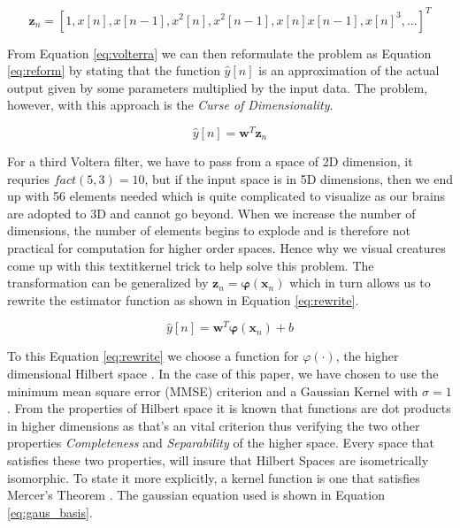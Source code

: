\documentclass[conference]{IEEEtran}
\begin{document}
\begin{equation}
\mathbf{z}_n = [1, x[n], x[n-1], x^2[n], x^2[n-1], x[n] x[n-1], x[n]^3, ...]^T
\label{eq:volterra}
\end{equation}

From Equation \ref{eq:volterra} we can then reformulate the problem as Equation \ref{eq:reform} by stating that the function $\hat{y}[n]$ is an approximation of the actual output
given by some parameters multiplied by the input data. The problem, however, with this approach is the \textit{Curse of Dimensionality}.

\begin{equation}
\hat{y}[n] = \mathbf{w}^T\mathbf{z}_n
\label{eq:reform}
\end{equation}

 For a third Voltera filter, we have to pass from a space of 2D dimension, it requries $fact(5, 3) = 10$, but if the input space is in 5D dimensions, then we end up with 56 elements needed which is quite complicated to visualize as our brains are adopted to 3D and cannot go beyond.
 When we increase the number of dimensions, the number of elements begins to explode and is therefore not practical for computation
 for higher order spaces. Hence why we visual creatures come up with this textit{kernel trick} to help solve this problem. The transformation can be generalized by $\mathbf{z}_n = \mathbf{\varphi}(\mathbf{x}_n)$ 
 which in turn allows us to rewrite the estimator function as shown in Equation \ref{eq:rewrite}. 
 
 \begin{equation}
\hat{y}[n] = \mathbf{w}^T\mathbf{\varphi}(\mathbf{x}_n) + b
\label{eq:rewrite}
\end{equation}

To this Equation \ref{eq:rewrite} we choose a function for $\varphi(\cdot)$, the higher dimensional Hilbert space \cite{kernelmethods}. In 
the case of this paper, we have chosen to use the minimum mean square error (MMSE) criterion and a Gaussian Kernel with $\sigma = 1$. From the properties of Hilbert space it is known that functions are dot products in higher dimensions as that's an vital criterion thus verifying the two other properties \textit{Completeness} and \textit{Separability} of the higher space. Every space that satisfies these two properties, will insure that Hilbert Spaces are isometrically isomorphic. To state it more explicitly, a kernel function is one that satisfies Mercer's Theorem \cite{kernelmethods}. The gaussian equation 
used is shown in Equation \ref{eq:gaus_basis}.
\end{document}

